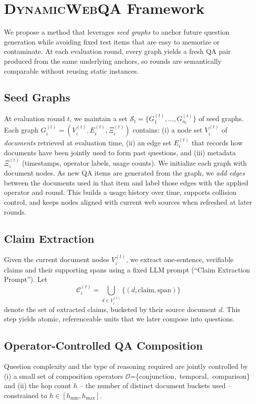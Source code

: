 \section{\textsc{DynamicWebQA} Framework}
\label{sec:methods}

We propose a method that leverages \emph{seed graphs} to anchor future question generation while avoiding fixed test items that are easy to memorize or contaminate. At each evaluation round, every graph yields a fresh QA pair produced from the same underlying anchors, so rounds are semantically comparable without reusing static instances.

\subsection{Seed Graphs}
At evaluation round $t$, we maintain a set $\mathcal{S}_t=\{G_1^{(t)},\ldots,G_{n_t}^{(t)}\}$ of seed graphs. Each graph $G_i^{(t)}=(V_i^{(t)},E_i^{(t)},\Xi_i^{(t)})$ contains:
(i) a node set $V_i^{(t)}$ of \emph{documents} retrieved at evaluation time,
(ii) an edge set $E_i^{(t)}$ that records how documents have been jointly used to form past questions, and
(iii) metadata $\Xi_i^{(t)}$ (timestamps, operator labels, usage counts).
We initialize each graph with document nodes. As new QA items are generated from the graph, we \emph{add edges} between the documents used in that item and label those edges with the applied operator and round. This builds a usage history over time, supports collision control, and keeps nodes aligned with current web sources when refreshed at later rounds.

\subsection{Claim Extraction}
Given the current document nodes $V_i^{(t)}$, we extract one-sentence, verifiable claims and their supporting spans using a fixed LLM prompt (``Claim Extraction Prompt''). Let
\[
\mathcal{C}_i^{(t)}=\bigcup_{d\in V_i^{(t)}}\{(d,\text{claim},\text{span})\}
\]
denote the set of extracted claims, bucketed by their source document $d$. This step yields atomic, referenceable units that we later compose into questions.


\subsection{Operator-Controlled QA Composition}
Question complexity and the type of reasoning required are jointly controlled by (i) a small set of composition operators $\mathcal{O}$=\{\textsf{conjunction},\ \textsf{temporal},\ \textsf{comparison}\} and (ii) the hop count $h$ -- the number of distinct document buckets used -- constrained to $h\in[h_{\min},h_{\max}]$.


